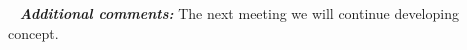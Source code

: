\begin{enumerate*}
  \end{enumerate*}
  
   \newline
  \textit{\textbf{Additional comments:}} The next meeting we will continue developing concept.

\fillpage

